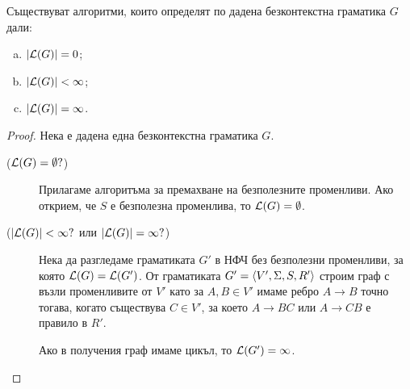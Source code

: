 \begin{thm}
  Съществуват алгоритми, които определят по дадена безконтекстна граматика $G$ дали:
  \begin{enumerate}[a)]
  \item 
    $\lvert{\mathcal{L}(G)}\rvert = 0$;
  \item
    $\lvert{\mathcal{L}(G)}\rvert < \infty$;
  \item
    $\lvert{\mathcal{L}(G)}\rvert = \infty$.
  \end{enumerate}
\end{thm}
\begin{proof}
  Нека е дадена една безконтекстна граматика $G$.
  \begin{description}
  \item[($\mathcal{L}(G) = \emptyset?$)]
    Прилагаме алгоритъма за премахване на безполезните променливи.
    Ако открием, че $S$ е безполезна променлива, то $\mathcal{L}(G) = \emptyset$.
  \item[($\lvert{\mathcal{L}(G)}\rvert < \infty?$ или $\lvert{\mathcal{L}(G)}\rvert = \infty?$)]
    Нека да разгледаме граматиката $G'$ в НФЧ без безполезни променливи, за която $\mathcal{L}(G) = \mathcal{L}(G')$.
    От граматиката $G' = \langle{V',\Sigma,S,R'}\rangle$ строим граф с възли променливите от $V'$ като
    за $A,B \in V'$ имаме ребро $A \to B$ точно тогава, когато съществува $C \in V'$,
    за което $A \to BC$ или $A \to CB$ е правило в $R'$.
    
    Ако в получения граф имаме цикъл, то $\mathcal{L}(G') = \infty$.
  \end{description}
\end{proof}

